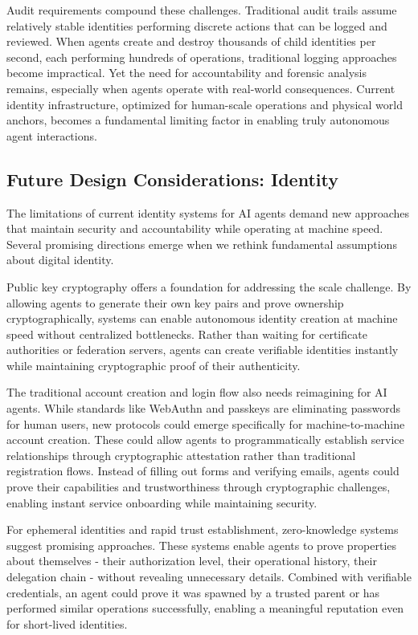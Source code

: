 \documentclass{article}
\begin{document}
Audit requirements compound these challenges. Traditional audit trails assume relatively stable identities performing discrete actions that can be logged and reviewed. When agents create and destroy thousands of child identities per second, each performing hundreds of operations, traditional logging approaches become impractical. Yet the need for accountability and forensic analysis remains, especially when agents operate with real-world consequences.
Current identity infrastructure, optimized for human-scale operations and physical world anchors, becomes a fundamental limiting factor in enabling truly autonomous agent interactions.


\subsection{Future Design Considerations: Identity}
\label{subsec:identity_future}
The limitations of current identity systems for AI agents demand new approaches that maintain security and accountability while operating at machine speed. Several promising directions emerge when we rethink fundamental assumptions about digital identity.

Public key cryptography offers a foundation for addressing the scale challenge. By allowing agents to generate their own key pairs and prove ownership cryptographically, systems can enable autonomous identity creation at machine speed without centralized bottlenecks. Rather than waiting for certificate authorities or federation servers, agents can create verifiable identities instantly while maintaining cryptographic proof of their authenticity.

The traditional account creation and login flow also needs reimagining for AI agents. While standards like WebAuthn and passkeys are eliminating passwords for human users, new protocols could emerge specifically for machine-to-machine account creation. These could allow agents to programmatically establish service relationships through cryptographic attestation rather than traditional registration flows. Instead of filling out forms and verifying emails, agents could prove their capabilities and trustworthiness through cryptographic challenges, enabling instant service onboarding while maintaining security.

For ephemeral identities and rapid trust establishment, zero-knowledge systems suggest promising approaches. These systems enable agents to prove properties about themselves - their authorization level, their operational history, their delegation chain - without revealing unnecessary details. Combined with verifiable credentials, an agent could prove it was spawned by a trusted parent or has performed similar operations successfully, enabling a meaningful reputation even for short-lived identities.
\end{document}
